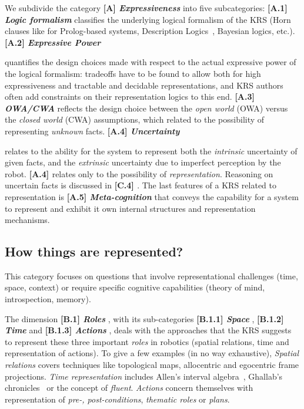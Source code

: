 \documentclass[journal]{IEEEtran}
\newcommand{\taxon}[2]{%
    \textbf{[#1] \emph{#2}}
}
\begin{document}
We subdivide the category \taxon{A}{Expressiveness} into five subcategories:
\taxon{A.1}{Logic formalism} classifies the underlying logical formalism of the
KRS (Horn clauses like for Prolog-based systems, Description
Logics~\cite{Baader2008}, Bayesian logics, etc.). \taxon{A.2}{Expressive Power}
quantifies the design choices made with respect to the actual expressive power
of the logical formalism: tradeoffs have to be found to allow both for high
expressiveness and tractable and decidable representations, and KRS authors
often add constraints on their representation logics to this end.
\taxon{A.3}{OWA/CWA} reflects the design choice between the \emph{open world}
(OWA) versus the \emph{closed world} (CWA) assumptions, which related to the
possibility of representing \emph{unknown} facts. \taxon{A.4}{Uncertainty}
relates to the ability for the system to represent both the \emph{intrinsic}
uncertainty of given facts, and the \emph{extrinsic} uncertainty due to
imperfect perception by the robot. \taxon{A.4}{} relates only to the possibility
of \emph{representation}. Reasoning on uncertain facts is discussed in
\taxon{C.4}{}. The last features of a KRS related to representation is
\taxon{A.5}{Meta-cognition} that conveys the capability for a system to
represent and exhibit it own internal structures and representation mechanisms.

\subsection{How things are represented?}
\label{sect|higher-level-domain-representation}

This category focuses on questions that involve
representational challenges (time, space, context) or require specific
cognitive capabilities (theory of mind, introspection, memory).

The dimension \taxon{B.1}{Roles}, with its sub-categories \taxon{B.1.1}{Space},
\taxon{B.1.2}{Time} and \taxon{B.1.3}{Actions}, deals with the approaches that
the KRS suggests to represent these three important \emph{roles} in robotics
(spatial relations, time and representation of actions). To give a few examples
(in no way exhaustive), \emph{Spatial relations} covers techniques like
topological maps, allocentric and egocentric frame projections. \emph{Time
representation} includes Allen's interval algebra~\cite{Allen1984}, Ghallab's
chronicles~\cite{Ghallab1996} or the concept of \emph{fluent}. \emph{Actions}
concern themselves with representation of \emph{pre-, post-conditions},
\emph{thematic roles} or \emph{plans}.
\end{document}
